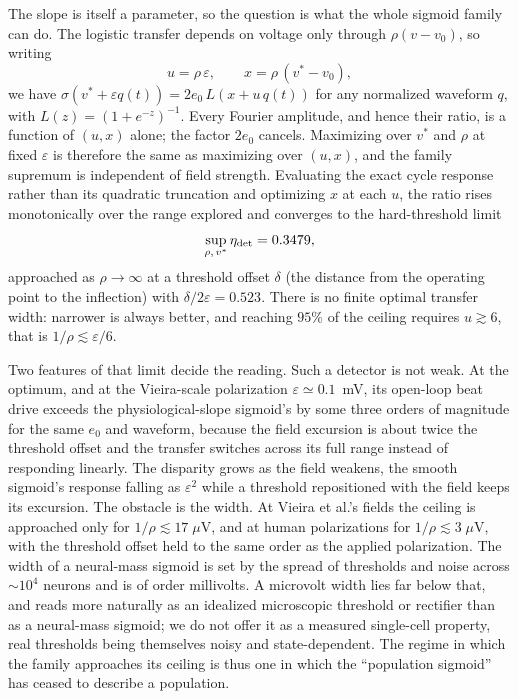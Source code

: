 \documentclass[11pt,a4paper]{article}
\newcommand{\Sig}{\sigma}
\begin{document}
The slope is itself a parameter, so the question is what the whole sigmoid family can do.
The logistic transfer depends on voltage only through $\rho(v-v_0)$, so writing
\begin{equation}
u=\rho\,\varepsilon,\qquad x=\rho\,(v^*-v_0),
\label{eq:reduced}
\end{equation}
we have $\Sig(v^*+\varepsilon q(t))=2e_0\,L(x+u\,q(t))$ for any normalized waveform $q$,
with $L(z)=(1+e^{-z})^{-1}$. Every Fourier amplitude, and hence their ratio, is a function
of $(u,x)$ alone; the factor $2e_0$ cancels. Maximizing over $v^*$ and $\rho$ at fixed
$\varepsilon$ is therefore the same as maximizing over $(u,x)$, and the family supremum is
independent of field strength. Evaluating the exact cycle response rather than its
quadratic truncation and optimizing $x$ at each $u$, the ratio rises monotonically over the
range explored and converges to the hard-threshold limit
\begin{equation}
\sup_{\rho,\,v^*}\eta_{\rm det}=0.3479 ,
\label{eq:etasup}
\end{equation}
approached as $\rho\to\infty$ at a threshold offset $\delta$ (the distance from the
operating point to the inflection) with $\delta/2\varepsilon=0.523$. There is no
finite optimal transfer width: narrower is always better, and reaching $95\%$ of the ceiling
requires $u\gtrsim6$, that is $1/\rho\lesssim\varepsilon/6$.

Two features of that limit decide the reading. Such a detector is not weak. At the optimum,
and at the Vieira-scale polarization $\varepsilon\!\simeq\!0.1$~mV, its open-loop beat drive
exceeds the physiological-slope sigmoid's by some three orders of magnitude for the same
$e_0$ and waveform, because the field excursion is about twice the threshold offset and the
transfer switches across its full range instead of responding linearly. The disparity grows
as the field weakens, the smooth sigmoid's response falling as $\varepsilon^2$ while a
threshold repositioned with the field keeps its excursion. The obstacle is the width.
At Vieira et al.'s fields the ceiling is approached only for $1/\rho\lesssim17\;\mu$V, and
at human polarizations for $1/\rho\lesssim3\;\mu$V, with the threshold offset held to the
same order as the applied polarization. The width of a neural-mass sigmoid is set by the
spread of thresholds and noise across $\sim 10^4$ neurons and is of order millivolts. A
microvolt width lies far below that, and reads more naturally as an idealized microscopic
threshold or rectifier than as a neural-mass sigmoid; we do not offer it as a measured
single-cell property, real thresholds being themselves noisy and state-dependent. The
regime in which the family approaches its ceiling is thus one in which the ``population
sigmoid'' has ceased to describe a population.
\end{document}
